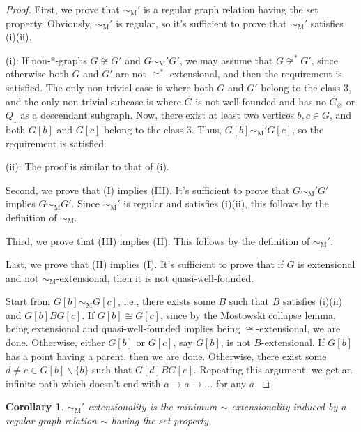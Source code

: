 \documentclass{amsart}
\newtheorem{corollary}{Corollary}
\begin{document}
\begin{proof}
    First, we prove that $\sim_\mathrm{M}'$ is a regular graph relation having the set property. Obviously, $\sim_\mathrm{M}'$ is regular, so it's sufficient to prove that $\sim_\mathrm{M}'$ satisfies (i)(ii).

    (i): If non-*-graphs $G\not\cong G'$ and $G\sim_\mathrm{M}' G'$, we may assume that $G\not\cong^* G'$, since otherwise both $G$ and $G'$ are not $\cong^*$-extensional, and then the requirement is satisfied. 
    The only non-trivial case is where both $G$ and $G'$ belong to the class 3, and the only non-trivial subcase is where $G$ is not well-founded and has no $G_\varnothing$ or $Q_1$ as a descendant subgraph. Now, there exist at least two vertices $b,c \in G$, and both $G[b]$ and $G[c]$ belong to the class 3. Thus, $G[b] \sim_\mathrm{M}' G[c]$, so the requirement is satisfied.

    (ii): The proof is similar to that of (i).
    
    Second, we prove that (I) implies (III). It's sufficient to prove that $G\sim_\mathrm{M}' G'$ implies $G\sim_\mathrm{M} G'$. Since $\sim_\mathrm{M}'$ is regular and satisfies (i)(ii), this follows by the definition of $\sim_\mathrm{M}$.

    Third, we prove that (III) implies (II). This follows by the definition of $\sim_\mathrm{M}'$.

    Last, we prove that (II) implies (I). It's sufficient to prove that if $G$ is extensional and not $\sim_\mathrm{M}$-extensional, then it is not quasi-well-founded.
    
    Start from $G[b] \sim_\mathrm{M} G[c]$, i.e., there exists some $B$ such that $B$ satisfies (i)(ii) and $G[b]BG[c]$. If $G[b]\cong G[c]$, since by the Mostowski collapse lemma, being extensional and quasi-well-founded implies being $\cong$-extensional, we are done. Otherwise, either $G[b]$ or $G[c]$, say $G[b]$, is not $B$-extensional. If $G[b]$ has a point having a parent, then we are done. Otherwise, there exist some $d \not= e \in G[b]\backslash\{b\}$ such that $G[d]BG[e]$. Repeating this argument, we get an infinite path which doesn't end with $a \to a \to\dots$ for any $a$.
\end{proof}

\begin{corollary}
    $\sim_\mathrm{M}'$-extensionality is the minimum $\sim$-extensionality induced by a regular graph relation $\sim$ having the set property.
\end{corollary}

\printbibliography
\end{document}
